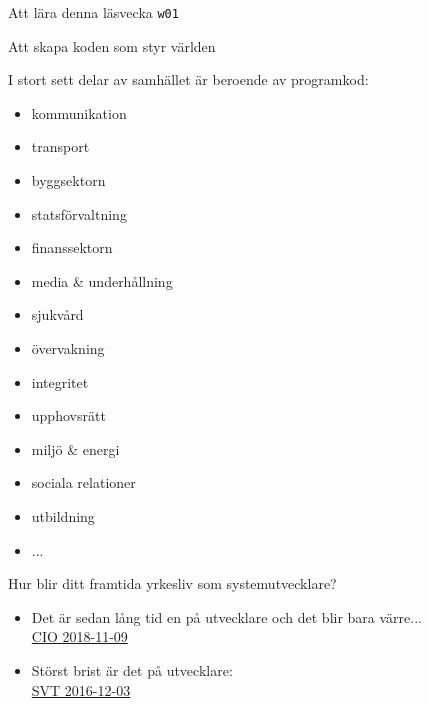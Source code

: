 


\ifkompendium\else  %
\begin{SlideExtra}{Att lära denna läsvecka \texttt{w01}}

\end{SlideExtra}
\fi


\ifkompendium\else  %

\begin{SlideExtra}{Att skapa koden som styr världen}
\begin{multicols}{2}\footnotesize
I stort sett  delar av samhället är beroende av programkod:
\begin{itemize}\scriptsize
\item kommunikation
\item transport
\item byggsektorn
\item statsförvaltning
\item finanssektorn
\item media \& underhållning
\item sjukvård
\item övervakning
\item integritet
\item upphovsrätt
\item miljö \& energi
\item sociala relationer
\item utbildning
\item ...
\end{itemize}
\columnbreak %
Hur blir ditt framtida yrkesliv som systemutvecklare?
\begin{itemize}
\item  Det är sedan lång tid en  på utvecklare och det blir bara värre... \\
\href{https://cio.idg.se/2.1782/1.710012/kompetenslarm-jobb-om-fem-ar?queryText=kompetensbrist}{CIO 2018-11-09} %

\item Störst brist är det på  utvecklare: \\
\href{https://www.svt.se/nyheter/inrikes/stor-brist-pa-programmerare-kvinnor-lockas-till-yrket}{SVT 2016-12-03}


\end{itemize}
\end{multicols}
\end{SlideExtra}
